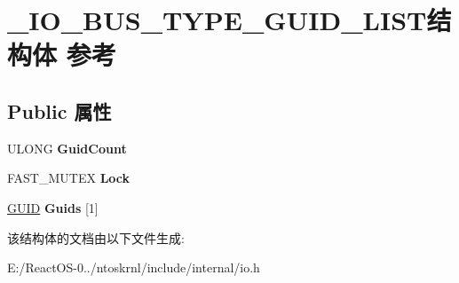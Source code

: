 \hypertarget{struct___i_o___b_u_s___t_y_p_e___g_u_i_d___l_i_s_t}{}\section{\+\_\+\+I\+O\+\_\+\+B\+U\+S\+\_\+\+T\+Y\+P\+E\+\_\+\+G\+U\+I\+D\+\_\+\+L\+I\+S\+T结构体 参考}
\label{struct___i_o___b_u_s___t_y_p_e___g_u_i_d___l_i_s_t}
\subsection*{Public 属性}
\begin{DoxyCompactItemize}
\item 
\mbox{\label{struct___i_o___b_u_s___t_y_p_e___g_u_i_d___l_i_s_t_a2f01a4c1121629aa351541a994917047}} 
U\+L\+O\+NG {\bfseries Guid\+Count}
\item 
\mbox{\label{struct___i_o___b_u_s___t_y_p_e___g_u_i_d___l_i_s_t_ae76bd82ccbeb32f6d4afb9c66d6cc870}} 
F\+A\+S\+T\+\_\+\+M\+U\+T\+EX {\bfseries Lock}
\item 
\mbox{\label{struct___i_o___b_u_s___t_y_p_e___g_u_i_d___l_i_s_t_a70fde20b13b80ff9324bd2847d7a2c8c}} 
\hyperlink{interface_g_u_i_d}{G\+U\+ID} {\bfseries Guids} \mbox{[}1\mbox{]}
\end{DoxyCompactItemize}


该结构体的文档由以下文件生成\+:\begin{DoxyCompactItemize}
\item 
E\+:/\+React\+O\+S-\/0../ntoskrnl/include/internal/io.\+h\end{DoxyCompactItemize}
